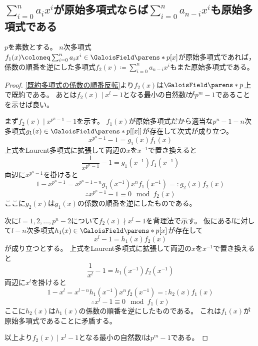         \subsection{\texorpdfstring{$\sum_{i=0}^n a_ix^i$}{a0 x0 + a1 x1 + ...}が原始多項式ならば\texorpdfstring{$\sum_{i=0}^n a_{n-i}x^i$}{a\{n-1\} x0 + a\{n-2\} x1 + ...}も原始多項式である}
            \begin{shadebox}
                $p$を素数とする。
                $n$次多項式$f_1(x) \coloneq \sum_{i=0}^n a_ix^i \in \GaloisField\parens*{p}[x]$が原始多項式であれば，係数の順番を逆にした多項式$f_2(x) \coloneq \sum_{i=0}^n a_{n-i}x^i$もまた原始多項式である。
            \end{shadebox}
            \begin{proof}
                \ref{既約多項式の係数の順番反転}より$f_2(x)$は$\GaloisField\parens*{p}$上で既約である。
                あとは$f_2(x) \mid x^l - 1$となる最小の自然数$l$が$p^m-1$であることを示せば良い。
                \par
                まず$f_2(x) \mid x^{p^n-1}-1$を示す。
                $f_1(x)$が原始多項式だから適当な$p^n-1-n$次多項式$g_1(x) \in \GaloisField\parens*{p}[[x]]$が存在して次式が成り立つ。
                \[ x^{p^n-1} - 1 = g_1(x)f_1(x) \]
                上式をLaurent多項式に拡張して両辺の$x$を$x^{-1}$で置き換えると
                \[ \frac{1}{x^{p^n-1}} - 1 = g_1(x^{-1})f_1(x^{-1}) \]
                両辺に$x^{p^n-1}$を掛けると
                \[ 1 - x^{p^n-1} = x^{p^n-1-n}g_1(x^{-1}) x^n f_1(x^{-1}) =: g_2(x)f_2(x) \]
                \[ \therefore x^{p^n-1} -1 \equiv 0 \mod f_2(x) \]
                ここに$g_2(x)$は$g_1(x)$の係数の順番を逆にしたものである。
                \par
                次に$l=1,2,\dotsc,p^n-2$について$f_2(x) \nmid x^l-1$を背理法で示す。
                仮にある$l$に対して$l-n$次多項式$h_1(x) \in \GaloisField\parens*{p}[x]$が存在して
                \[ x^l - 1 = h_1(x)f_2(x) \]
                が成り立つとする。
                上式をLaurent多項式に拡張して両辺の$x$を$x^{-1}$で置き換えると
                \[ \frac{1}{x^l} - 1 = h_1(x^{-1})f_2(x^{-1}) \]
                両辺に$x^l$を掛けると
                \[ 1 - x^l = x^{l-n}h_1(x^{-1}) x^n f_2(x^{-1}) =: h_2(x)f_1(x) \]
                \[ \therefore x^l - 1 \equiv 0 \mod f_1(x) \]
                ここに$h_2(x)$は$h_1(x)$の係数の順番を逆にしたものである。
                これは$f_1(x)$が原始多項式であることに矛盾する。
                \par
                以上より$f_2(x) \mid x^l - 1$となる最小の自然数$l$は$p^m-1$である。
            \end{proof}
